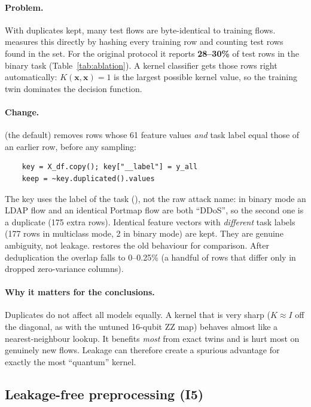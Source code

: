 \paragraph{Problem.} With duplicates kept, many test flows are byte-identical to training flows.
 measures this directly by hashing every training row and
counting test rows found in the set. For the original protocol it reports
\textbf{28--30\%} of test rows in the binary task (Table~\ref{tab:ablation}). A kernel
classifier gets those rows right automatically: $K(\bm x,\bm x)=1$ is the largest possible kernel
value, so the training twin dominates the decision function.

\paragraph{Change.}  (the default) removes rows whose 61 feature values
\emph{and} task label equal those of an earlier row, before any sampling:
\begin{verbatim}
    key = X_df.copy(); key["__label"] = y_all
    keep = ~key.duplicated().values
\end{verbatim}
The key uses the label of the task (), not the raw attack name: in binary mode an
LDAP flow and an identical Portmap flow are both ``DDoS'', so the second one is a duplicate
(175 extra rows). Identical feature vectors with \emph{different} task labels (177 rows in
multiclass mode, 2 in binary mode) are kept. They are genuine
ambiguity, not leakage.  restores the old behaviour for comparison.
After deduplication the overlap falls to 0--0.25\% (a handful of rows that differ only in
dropped zero-variance columns).

\paragraph{Why it matters for the conclusions.} Duplicates do not affect all models equally. A
kernel that is very sharp ($K\approx I$ off the diagonal, as with the untuned 16-qubit ZZ map)
behaves almost like a nearest-neighbour lookup. It benefits \emph{most} from exact twins and is
hurt most on genuinely new flows. Leakage can therefore create a spurious advantage for exactly
the most ``quantum'' kernel.

\subsection{Leakage-free preprocessing (I5)}
